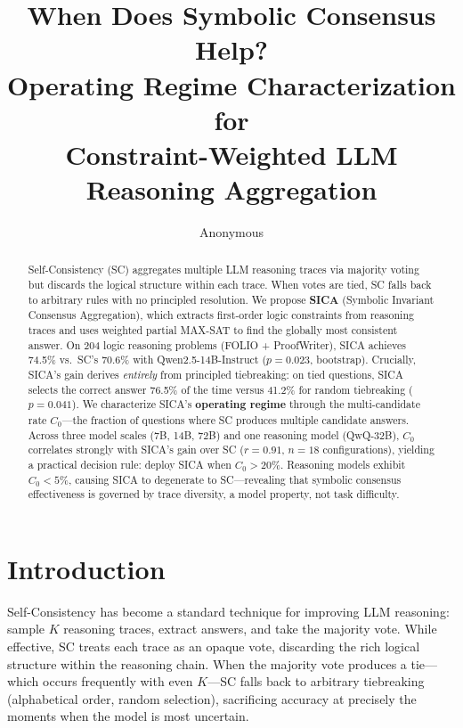 \documentclass[11pt,a4paper]{article}
\title{When Does Symbolic Consensus Help?\\Operating Regime Characterization for\\Constraint-Weighted LLM Reasoning Aggregation}
\author{Anonymous}
\begin{document}
\maketitle

\begin{abstract}
Self-Consistency (SC) aggregates multiple LLM reasoning traces via majority voting but discards the logical structure within each trace. When votes are tied, SC falls back to arbitrary rules with no principled resolution. We propose \textbf{SICA} (Symbolic Invariant Consensus Aggregation), which extracts first-order logic constraints from reasoning traces and uses weighted partial MAX-SAT to find the globally most consistent answer. On 204 logic reasoning problems (FOLIO + ProofWriter), SICA achieves 74.5\% vs.\ SC's 70.6\% with Qwen2.5-14B-Instruct ($p=0.023$, bootstrap). Crucially, SICA's gain derives \emph{entirely} from principled tiebreaking: on tied questions, SICA selects the correct answer 76.5\% of the time versus 41.2\% for random tiebreaking ($p=0.041$). We characterize SICA's \textbf{operating regime} through the multi-candidate rate $C_0$---the fraction of questions where SC produces multiple candidate answers. Across three model scales (7B, 14B, 72B) and one reasoning model (QwQ-32B), $C_0$ correlates strongly with SICA's gain over SC ($r=0.91$, $n=18$ configurations), yielding a practical decision rule: deploy SICA when $C_0 > 20\%$. Reasoning models exhibit $C_0 < 5\%$, causing SICA to degenerate to SC---revealing that symbolic consensus effectiveness is governed by trace diversity, a model property, not task difficulty.
\end{abstract}

\section{Introduction}

Self-Consistency \cite{wang2023selfconsistency} has become a standard technique for improving LLM reasoning: sample $K$ reasoning traces, extract answers, and take the majority vote. While effective, SC treats each trace as an opaque vote, discarding the rich logical structure within the reasoning chain. When the majority vote produces a tie---which occurs frequently with even $K$---SC falls back to arbitrary tiebreaking (alphabetical order, random selection), sacrificing accuracy at precisely the moments when the model is most uncertain.
\end{document}

